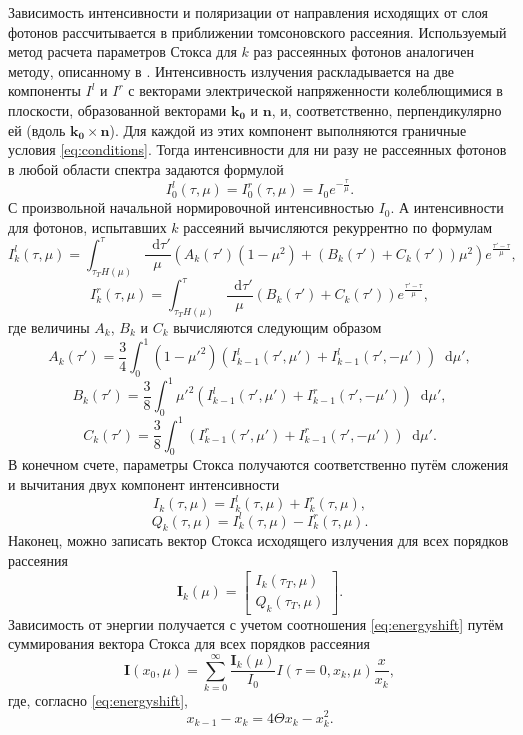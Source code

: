 \documentclass[14pt,a4paper]{extarticle}
\newcommand{\be}{\begin{equation}}
\newcommand{\ee}{\end{equation}}
\newcommand*\df {\mathop{}\!\mathrm{d}}
\begin{document}
			Зависимость интенсивности и поляризации от направления исходящих от слоя фотонов рассчитывается в приближении томсоновского рассеяния. 
			Используемый метод расчета параметров Стокса для $k$ раз рассеянных фотонов аналогичен методу, описанному в 
			\cite{Sunyaev1985}.
			Интенсивность излучения раскладывается на две компоненты $I^l$ и $I^r$ с векторами электрической напряженности колеблющимися в плоскости, образованной векторами $\bm{k_0} $ и $ \bm n$, и, соответственно, перпендикулярно ей (вдоль $\bm{k_0} \times \bm n$).
			Для каждой из этих компонент выполняются граничные условия \eqref{eq:conditions}.
			Тогда интенсивности для ни разу не рассеянных фотонов в любой области спектра задаются формулой 
			\be
				I_0^l(\tau,\mu)=I_0^r(\tau,\mu)=I_0 e^{-\frac{\tau}{\mu}}.
			\ee
			С произвольной начальной нормировочной интенсивностью $I_0$.
			А интенсивности для фотонов, испытавших $k$ рассеяний вычисляются рекуррентно по формулам
			\be
				I^l_{k} (\tau,\mu) = \int_{\tau_TH(\mu)}^\tau \frac{\df \tau'}{\mu}  \left(
					A_k(\tau')\left(1-\mu^2\right)+\left(B_k(\tau')+C_k(\tau')\right)\mu^2
				\right)e^{\frac{\tau'-\tau}\mu},
			\ee
			\be
				I^r_k (\tau,\mu) = \int_{\tau_TH(\mu)}^\tau \frac{\df \tau'}{\mu}  \left(B_k(\tau')+C_k(\tau')
				\right)e^{\frac{\tau'-\tau}\mu},
			\ee
			где величины $A_k$, $B_k$ и $C_k$ вычисляются следующим образом
			$$
				A_k(\tau') = \frac34\int_0^1  \left(1-\mu'^2\right)\left(I_{k-1}^l(\tau',\mu')+I_{k-1}^l(\tau',-\mu')\right) \df \mu',
			$$\be
				B_k(\tau') = \frac38\int_0^1  \mu'^2 \left(I_{k-1}^l(\tau',\mu')+I_{k-1}^r(\tau',-\mu')\right) \df \mu',
			\ee$$
				C_k(\tau') = \frac38\int_0^1  \left(I_{k-1}^r(\tau',\mu')+I_{k-1}^r(\tau',-\mu')\right) \df \mu'.
			$$
			В конечном счете, параметры Стокса получаются соответственно путём сложения и вычитания двух компонент интенсивности 
			\be
				I_{k}(\tau,\mu)=I^l_{k}(\tau,\mu)+I^r_{k}(\tau,\mu),
			\ee\be
				Q_{k}(\tau,\mu)=I^l_{k}(\tau,\mu)-I^r_{k}(\tau,\mu).
			\ee
			Наконец, можно записать вектор Стокса исходящего излучения для  всех порядков рассеяния
			\be
				\bm I_{k}(\mu)=\begin{bmatrix}I_{k}(\tau_T,\mu)\\Q_{k}(\tau_T,\mu)\end{bmatrix}.
			\ee
			Зависимость от энергии получается с учетом соотношения \eqref{eq:energyshift}
			путём суммирования вектора Стокса для всех порядков рассеяния
			\be
				\bm I(x_0,\mu)=\sum_{k=0}^{\infty}\frac{\bm I_{k}(\mu)}{I_0} I\left(\tau=0,x_k,\mu\right) \frac{x}{x_k},
			\ee
			где, согласно \eqref{eq:energyshift}, \be
				x_{k-1}-x_k=4\Theta x_k - x_k^2.
			\ee
\end{document}

